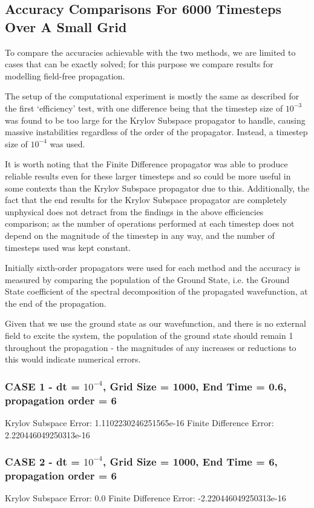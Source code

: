 \subsection{Accuracy Comparisons For 6000 Timesteps Over A Small Grid}
To compare the accuracies achievable with the two methods, we are limited to cases that can be exactly solved; for this purpose we compare results for modelling field-free propagation. 

The setup of the computational experiment is mostly the same as described for the first `efficiency' test, with one difference being that the timestep size of $10^{-3}$ was found to be too large for the Krylov Subspace propagator to handle, causing massive instabilities regardless of the order of the propagator. Instead, a timestep size of $10^{-4}$ was used. 

It is worth noting that the Finite Difference propagator was able to produce reliable results even for these larger timesteps and so could be more useful in some contexts than the Krylov Subspace propagator due to this. Additionally, the fact that the end results for the Krylov Subspace propagator are completely unphysical does not detract from the findings in the above efficiencies comparison; as the number of operations performed at each timestep does not depend on the magnitude of the timestep in any way, and the number of timesteps used was kept constant.

Initially sixth-order propagators were used for each method and the accuracy is measured by comparing the population of the Ground State, i.e. the Ground State coefficient of the spectral decomposition of the propagated wavefunction, at the end of the propagation. 

Given that we use the ground state as our wavefunction, and there is no external field to excite the system, the population of the ground state should remain 1 throughout the propagation - the magnitudes of any increases or reductions to this would indicate numerical errors.

\subsubsection{CASE 1 - dt = $10^{-4}$, Grid Size = 1000, End Time = 0.6, propagation order = 6}
Krylov Subspace Error: 1.1102230246251565e-16\newline
Finite Difference Error: 2.220446049250313e-16  

\subsubsection{CASE 2 - dt = $10^{-4}$, Grid Size = 1000, End Time = 6, propagation order = 6}
Krylov Subspace Error: 0.0\newline
Finite Difference Error: -2.220446049250313e-16 

